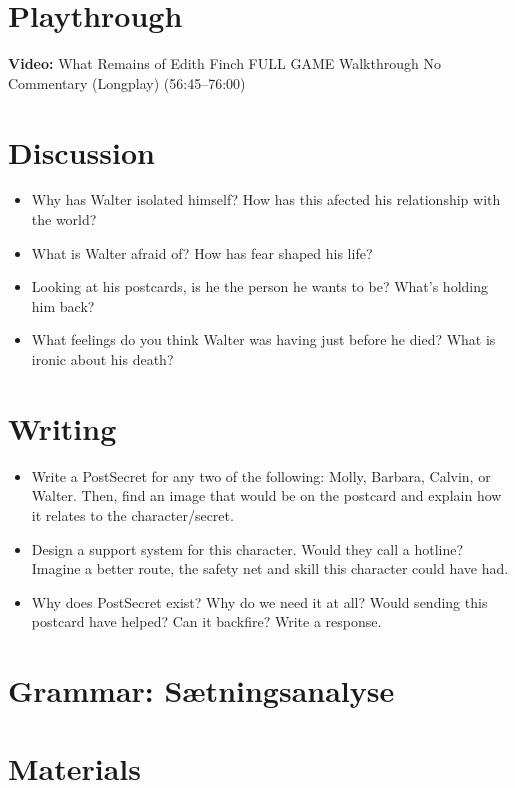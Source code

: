 \documentclass[11pt,a4paper,oneside]{book}
\begin{document}
\section*{Playthrough}

\par\noindent\textbf{Video:} What Remains of Edith Finch FULL GAME Walkthrough No Commentary (Longplay) (56:45–76:00)\par\medskip

\section*{Discussion}

\begin{itemize}
\item Why has Walter isolated himself? How has this afected his relationship with the world?
\item What is Walter afraid of? How has fear shaped his life?
\item Looking at his postcards, is he the person he wants to be? What’s holding him back?
\item What feelings do you think Walter was having just before he died? What is ironic about his death?
\end{itemize}

\section*{Writing}

\begin{itemize}
\item Write a PostSecret for any two of the following: Molly, Barbara, Calvin, or Walter. Then, find an image that would be on the postcard and explain how it relates to the character/secret.
\item Design a support system for this character. Would they call a hotline? Imagine a better route, the safety net and skill this character could have had.
\item Why does PostSecret exist? Why do we need it at all? Would sending this postcard have helped? Can it backfire? Write a response.
\end{itemize}

\section*{Grammar: Sætningsanalyse}

\section*{Materials}
\end{document}
